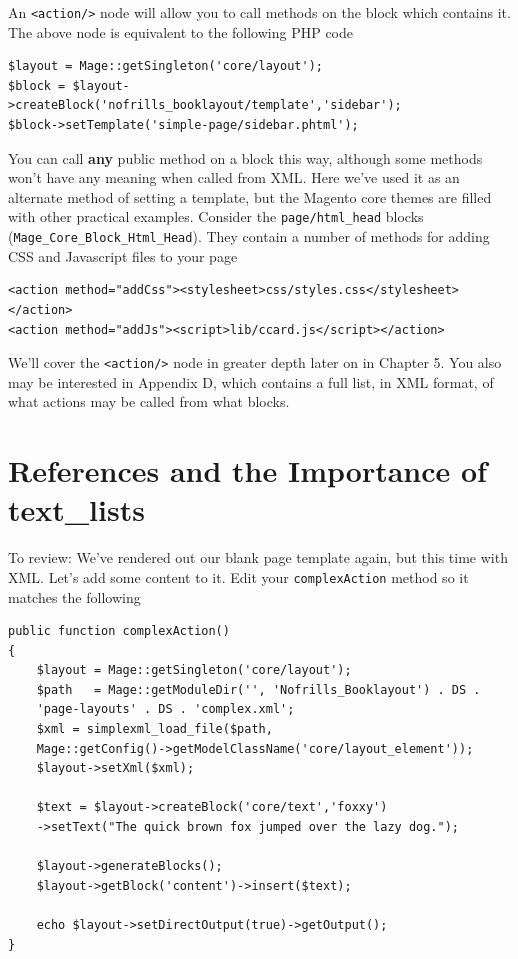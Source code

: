 \documentclass[oneside]{book}
\begin{document}
An \footnotesize\texttt{\textless action/\textgreater } \normalsize  node will allow you to call methods on the block which contains it.  The above node is equivalent to the following PHP code

\begin{lstlisting}
$layout = Mage::getSingleton('core/layout');
$block = $layout->createBlock('nofrills_booklayout/template','sidebar');
$block->setTemplate('simple-page/sidebar.phtml');

\end{lstlisting}


You can call \textbf{any} public method on a block this way, although some methods won't have any meaning when called from XML.  Here we've used it as an alternate method of setting a template, but the Magento core themes are filled with other practical examples.  Consider the \footnotesize\texttt{page/html\_head} \normalsize  blocks (\footnotesize\texttt{Mage\_Core\_Block\_Html\_Head}\normalsize).  They contain a number of methods for adding CSS and Javascript files to your page

\begin{lstlisting}
<action method="addCss"><stylesheet>css/styles.css</stylesheet></action>
<action method="addJs"><script>lib/ccard.js</script></action>

\end{lstlisting}


We'll cover the \footnotesize\texttt{\textless action/\textgreater } \normalsize  node in greater depth later on in Chapter 5.  You also may be interested in Appendix D, which contains a full list, in XML format, of what actions may be called from what blocks.

\section{References and the Importance of text\_lists}

To review: We've rendered out our blank page template again, but this time with XML.  Let's add some content to it.  Edit your \footnotesize\texttt{complexAction} \normalsize  method so it matches the following

\begin{lstlisting}
public function complexAction()
{
    $layout = Mage::getSingleton('core/layout');
    $path   = Mage::getModuleDir('', 'Nofrills_Booklayout') . DS .
    'page-layouts' . DS . 'complex.xml';
    $xml = simplexml_load_file($path,
    Mage::getConfig()->getModelClassName('core/layout_element'));
    $layout->setXml($xml);

    $text = $layout->createBlock('core/text','foxxy')
    ->setText("The quick brown fox jumped over the lazy dog.");

    $layout->generateBlocks();
    $layout->getBlock('content')->insert($text);

    echo $layout->setDirectOutput(true)->getOutput();
}

\end{lstlisting}
\end{document}

